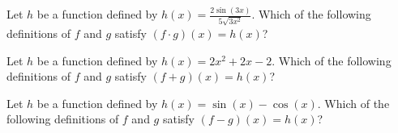 \documentclass{ximera}
\author{Kenneth Berglund}
\begin{document}
\begin{exercise}
\item Let $h$ be a function defined by $h(x) = \frac{2\sin(3x)}{5\sqrt{3x^2}}$. Which of the following definitions of $f$ and $g$ satisfy $(f \cdot g)(x) = h(x)$?
\begin{multipleChoice}
\end{multipleChoice}

\item Let $h$ be a function defined by $h(x) = 2x^2 + 2x - 2$. Which of the following definitions of $f$ and $g$ satisfy $(f + g)(x) = h(x)$?
\begin{multipleChoice}
\end{multipleChoice}

\item Let $h$ be a function defined by $h(x) = \sin(x) - \cos(x)$. Which of the following definitions of $f$ and $g$ satisfy $(f - g)(x) = h(x)$?
\begin{multipleChoice}
\end{multipleChoice}

\end{exercise}
\end{document}
